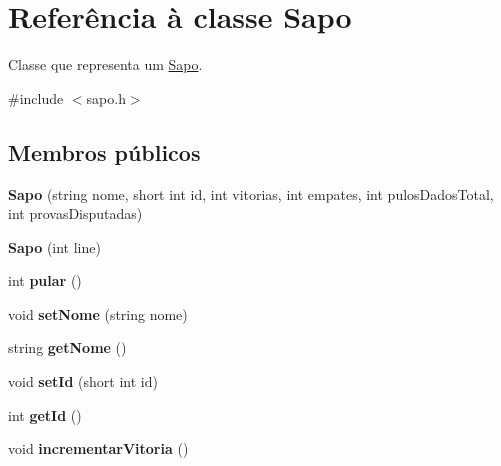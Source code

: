 \hypertarget{classSapo}{}\section{Referência à classe Sapo}
\label{classSapo}


Classe que representa um \hyperlink{classSapo}{Sapo}.  




{\ttfamily \#include $<$sapo.\+h$>$}

\subsection*{Membros públicos}
\begin{DoxyCompactItemize}
\item 
{\bfseries Sapo} (string nome, short int id, int vitorias, int empates, int pulos\+Dados\+Total, int provas\+Disputadas)\hypertarget{classSapo_a07f55b030964376d57c3523035fcbcec}{}\label{classSapo_a07f55b030964376d57c3523035fcbcec}

\item 
{\bfseries Sapo} (int line)\hypertarget{classSapo_ab8cc127ef1e381492aabd0da261fa868}{}\label{classSapo_ab8cc127ef1e381492aabd0da261fa868}

\item 
int {\bfseries pular} ()\hypertarget{classSapo_a59751d925e844fda0719d99939b8be2a}{}\label{classSapo_a59751d925e844fda0719d99939b8be2a}

\item 
void {\bfseries set\+Nome} (string nome)\hypertarget{classSapo_a21384d051b2ddfc06f63405bcafd57b7}{}\label{classSapo_a21384d051b2ddfc06f63405bcafd57b7}

\item 
string {\bfseries get\+Nome} ()\hypertarget{classSapo_acfb11cd24152f00c9a4996f26f3ee39b}{}\label{classSapo_acfb11cd24152f00c9a4996f26f3ee39b}

\item 
void {\bfseries set\+Id} (short int id)\hypertarget{classSapo_a321064f5be7b3df9d421a44a485e9760}{}\label{classSapo_a321064f5be7b3df9d421a44a485e9760}

\item 
int {\bfseries get\+Id} ()\hypertarget{classSapo_aa33722331db1073cbd0faa58445030f9}{}\label{classSapo_aa33722331db1073cbd0faa58445030f9}

\item 
void {\bfseries incrementar\+Vitoria} ()\hypertarget{classSapo_aec1b015f12f87ca82bca5443f527f423}{}\label{classSapo_aec1b015f12f87ca82bca5443f527f423}


\end{DoxyCompactItemize}
